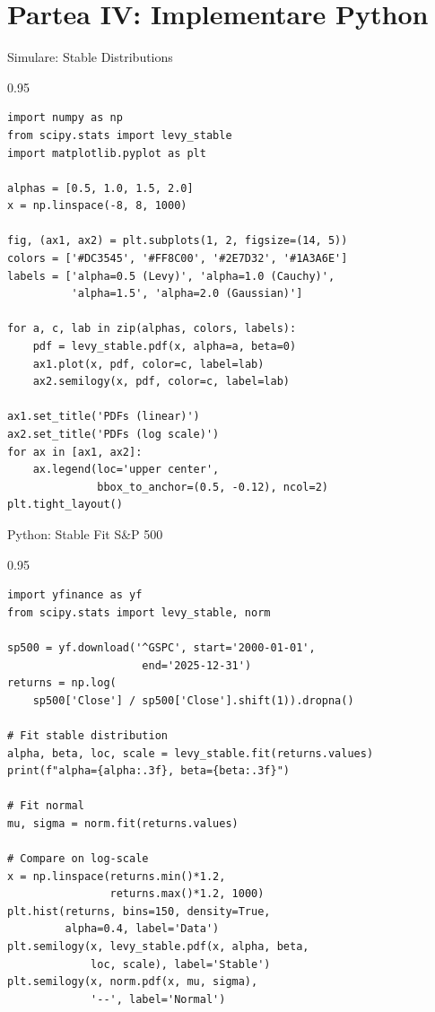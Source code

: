 \documentclass[9pt, aspectratio=169, t]{beamer}
\begin{document}
\section{Partea IV: Implementare Python}

\begin{frame}[fragile]{Simulare: Stable Distributions}
    \begin{cminipage}{0.95\textwidth}
\begin{lstlisting}[basicstyle=\ttfamily\scriptsize]
import numpy as np
from scipy.stats import levy_stable
import matplotlib.pyplot as plt

alphas = [0.5, 1.0, 1.5, 2.0]
x = np.linspace(-8, 8, 1000)

fig, (ax1, ax2) = plt.subplots(1, 2, figsize=(14, 5))
colors = ['#DC3545', '#FF8C00', '#2E7D32', '#1A3A6E']
labels = ['alpha=0.5 (Levy)', 'alpha=1.0 (Cauchy)',
          'alpha=1.5', 'alpha=2.0 (Gaussian)']

for a, c, lab in zip(alphas, colors, labels):
    pdf = levy_stable.pdf(x, alpha=a, beta=0)
    ax1.plot(x, pdf, color=c, label=lab)
    ax2.semilogy(x, pdf, color=c, label=lab)

ax1.set_title('PDFs (linear)')
ax2.set_title('PDFs (log scale)')
for ax in [ax1, ax2]:
    ax.legend(loc='upper center',
              bbox_to_anchor=(0.5, -0.12), ncol=2)
plt.tight_layout()
\end{lstlisting}
    \end{cminipage}
\end{frame}

\begin{frame}[fragile]{Python: Stable Fit S\&P 500}
    \begin{cminipage}{0.95\textwidth}
\begin{lstlisting}[basicstyle=\ttfamily\scriptsize]
import yfinance as yf
from scipy.stats import levy_stable, norm

sp500 = yf.download('^GSPC', start='2000-01-01',
                     end='2025-12-31')
returns = np.log(
    sp500['Close'] / sp500['Close'].shift(1)).dropna()

# Fit stable distribution
alpha, beta, loc, scale = levy_stable.fit(returns.values)
print(f"alpha={alpha:.3f}, beta={beta:.3f}")

# Fit normal
mu, sigma = norm.fit(returns.values)

# Compare on log-scale
x = np.linspace(returns.min()*1.2,
                returns.max()*1.2, 1000)
plt.hist(returns, bins=150, density=True,
         alpha=0.4, label='Data')
plt.semilogy(x, levy_stable.pdf(x, alpha, beta,
             loc, scale), label='Stable')
plt.semilogy(x, norm.pdf(x, mu, sigma),
             '--', label='Normal')
\end{lstlisting}
    \end{cminipage}
\end{frame}
\end{document}
